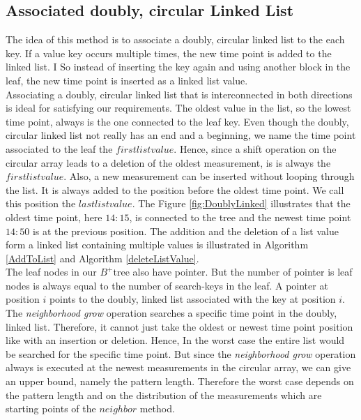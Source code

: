 \documentclass[abstracton,12pt]{scrreprt}
\begin{document}
\subsection{Associated doubly, circular Linked List}
\label{doublyLinked}
The idea of this method is to associate a doubly, circular linked list to the each key. If a value key occurs multiple times, the new time point is added to the linked list.  I  So instead of inserting the key again and using another block in the leaf, the new time point is inserted as a linked list value.\\ 
Associating a doubly, circular linked list that is interconnected in both directions is ideal for satisfying our requirements. The oldest value in the list, so the lowest time point, always is the one connected to the leaf key. Even though the doubly, circular linked list not really has an end and a beginning, we name the time point associated to the leaf the $first list value$. Hence, since a shift operation on the circular array leads to a deletion of the oldest measurement, is is always the $first list value$. Also, a new measurement can be inserted without looping through the list. It is always added to the position before the oldest time point. We call this position the $last list value$. The Figure \ref{fig:DoublyLinked} illustrates that the oldest time point, here $14:15$, is connected to the tree and the newest time point $14:50$ is at the previous position. The addition and the deletion of a list value form a linked list containing multiple values is illustrated in Algorithm \ref{AddToList} and Algorithm \ref{deleteListValue}.\\
The leaf nodes in our $B^+$tree also have pointer. But the number of pointer is leaf nodes is always equal to the number of search-keys in the leaf. A pointer at position $i$ points to the doubly, linked list associated with the key at position $i$.\\
The \emph{neighborhood grow} operation searches a specific time point in the doubly, linked list. Therefore, it cannot just take the oldest or newest time point position like with an insertion or deletion. Hence, In the worst case the entire list would be searched for the specific time point. But since the \emph{neighborhood grow} operation always is executed at the newest measurements in the circular array, we can give an upper bound, namely the pattern length. Therefore the worst case depends on the pattern length and on the distribution of the measurements which are  starting points of the $neighbor$ method.  
\end{document}
